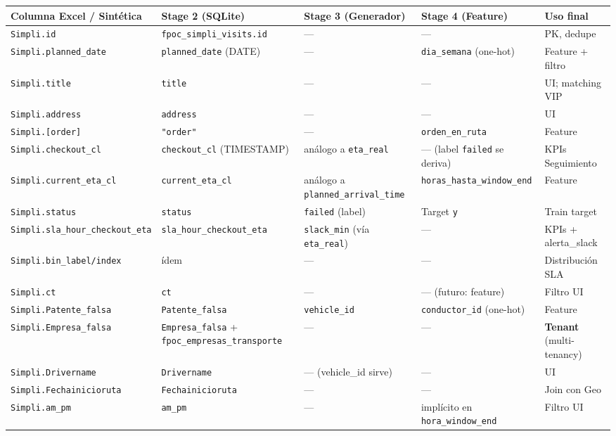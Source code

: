 \documentclass[11pt,a4paper]{article}
\begin{document}
\begin{landscape}
\footnotesize
\begin{longtable}{p{4cm} p{3cm} p{3.5cm} p{4cm} p{4.5cm}}
\toprule
\textbf{Columna Excel / Sintética} & \textbf{Stage 2 (SQLite)} & \textbf{Stage 3 (Generador)} & \textbf{Stage 4 (Feature)} & \textbf{Uso final} \\
\midrule
\endhead
\texttt{Simpli.id} & \texttt{fpoc\_simpli\_visits.id} & --- & --- & PK, dedupe \\
\texttt{Simpli.planned\_date} & \texttt{planned\_date} (DATE) & --- & \texttt{dia\_semana} (one-hot) & Feature + filtro \\
\texttt{Simpli.title} & \texttt{title} & --- & --- & UI; matching VIP \\
\texttt{Simpli.address} & \texttt{address} & --- & --- & UI \\
\texttt{Simpli.[order]} & \texttt{"order"} & --- & \texttt{orden\_en\_ruta} & Feature \\
\texttt{Simpli.checkout\_cl} & \texttt{checkout\_cl} (TIMESTAMP) & análogo a \texttt{eta\_real} & --- (label \texttt{failed} se deriva) & KPIs Seguimiento \\
\texttt{Simpli.current\_eta\_cl} & \texttt{current\_eta\_cl} & análogo a \texttt{planned\_arrival\_time} & \texttt{horas\_hasta\_window\_end} & Feature \\
\texttt{Simpli.status} & \texttt{status} & \texttt{failed} (label) & Target \texttt{y} & Train target \\
\texttt{Simpli.sla\_hour\_checkout\_eta} & \texttt{sla\_hour\_checkout\_eta} & \texttt{slack\_min} (vía \texttt{eta\_real}) & --- & KPIs + alerta\_slack \\
\texttt{Simpli.bin\_label/index} & ídem & --- & --- & Distribución SLA \\
\texttt{Simpli.ct} & \texttt{ct} & --- & --- (futuro: feature) & Filtro UI \\
\texttt{Simpli.Patente\_falsa} & \texttt{Patente\_falsa} & \texttt{vehicle\_id} & \texttt{conductor\_id} (one-hot) & Feature \\
\texttt{Simpli.Empresa\_falsa} & \texttt{Empresa\_falsa} + \texttt{fpoc\_empresas\_transporte} & --- & --- & \textbf{Tenant} (multi-tenancy) \\
\texttt{Simpli.Drivername} & \texttt{Drivername} & --- (vehicle\_id sirve) & --- & UI \\
\texttt{Simpli.Fechainicioruta} & \texttt{Fechainicioruta} & --- & --- & Join con Geo \\
\texttt{Simpli.am\_pm} & \texttt{am\_pm} & --- & implícito en \texttt{hora\_window\_end} & Filtro UI \\

\end{longtable}
\end{landscape}
\end{document}
